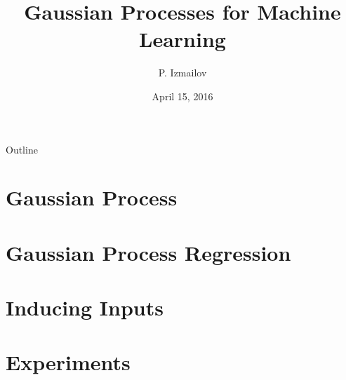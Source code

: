 \documentclass{beamer}
\title{Gaussian Processes for Machine Learning}
\author{P. Izmailov}
\date{April 15, 2016}
\begin{document}
	\begin{frame}
		\maketitle
	\end{frame}
		\begin{frame}{Outline}
			\tableofcontents[pausesections]
		\end{frame}
	\section{Gaussian Process}
		
	\section{Gaussian Process Regression}
		
	\section{Inducing Inputs}
		
	\section{Experiments}
		
\end{document}
